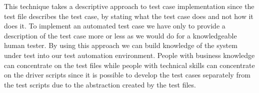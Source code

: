 This technique takes a descriptive approach to test case implementation since
the test file describes the test case, by stating what the test case does and
not how it does it. To implement an automated test case we have only to provide
a description of the test case more or less as we would do for a knowledgeable
human tester. By using this approach we can build knowledge of the system under
test into our test automation environment. People with business knowledge can
concentrate on the test files while people with technical skills can concentrate
on the driver scripts since it is possible to develop the test cases separately
from the test scripts due to the abstraction created by the test files.
